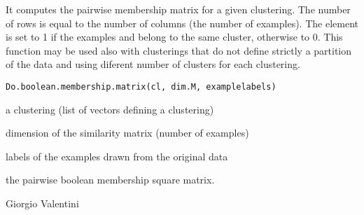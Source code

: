 \documentclass{article}
\begin{document}
\begin{Description}\relax
It computes the pairwise membership matrix for a given clustering. The number of rows is equal to the number of columns (the number of examples).
The element  is set to 1 if the examples  and  belong to the same cluster, otherwise to 0. 
This function may be used also with clusterings that do not define strictly a partition of the data and using
diferent number of clusters for each clustering.
\end{Description}
\begin{Usage}
\begin{verbatim}
Do.boolean.membership.matrix(cl, dim.M, examplelabels)
\end{verbatim}
\end{Usage}
\begin{Arguments}
\begin{ldescription}
\item[\code{cl}] a clustering (list of vectors defining a clustering) 
\item[\code{dim.M}] dimension of the similarity matrix (number of examples) 
\item[\code{examplelabels}] labels of the examples drawn from the original data 
\end{ldescription}
\end{Arguments}
\begin{Value}
the pairwise boolean membership square matrix.
\end{Value}
\begin{Author}\relax
Giorgio Valentini 
\end{Author}
\begin{Examples}
\end{Examples}
\end{document}
